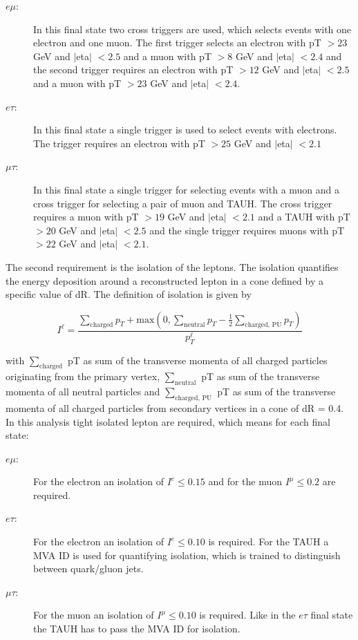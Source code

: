 \begin{description}
	\item [$e\mu$:] In this final state two cross triggers are used, which selects events with one electron and one muon. The first trigger selects an electron with \gls{pT} $> 23$ GeV and $|$\gls{eta}$|$ $< 2.5$ and a muon with \gls{pT} $> 8$ GeV and $|$\gls{eta}$|$ $< 2.4$ and the second trigger requires an electron with \gls{pT} $> 12$ GeV and $|$\gls{eta}$|$ $< 2.5$ and a muon with \gls{pT} $> 23$ GeV and $|$\gls{eta}$|$ $< 2.4$. 
	\item [$e\tau$:] In this final state a single trigger is used to select events with electrons. The trigger requires an electron with \gls{pT} $> 25$ GeV and $|$\gls{eta}$|$ $< 2.1$
	\item [$\mu\tau$:] In this final state a single trigger for selecting events with a muon and a cross trigger for selecting a pair of muon and \gls{TAUH}. The cross trigger requires a muon with \gls{pT} $> 19$ GeV and $|$\gls{eta}$|$ $< 2.1$ and a \gls{TAUH} with \gls{pT} $> 20$ GeV and $|$\gls{eta}$|$ $< 2.5$ and the single trigger requires muons with \gls{pT} $> 22$ GeV and $|$\gls{eta}$|$ $< 2.1$.
\end{description}

The second requirement is the isolation of the leptons. The isolation quantifies the energy deposition around a reconstructed lepton in a cone defined by a specific value of \gls{dR}. The definition of isolation is given by

\begin{equation}
	\label{eq:eq_3_1}
	I^{\ell} = \frac{\sum_{\text{charged}} p_{T} + \text{max}(0, \sum_{\text{neutral}} p_{T} - \frac{1}{2}\sum_{\text{charged, PU}} p_{T})}{p_T^{\ell}}  
\end{equation} 

with $\sum_{\text{charged}}$ \gls{pT} as sum of the transverse momenta of all charged particles originating from the primary vertex, $\sum_{\text{neutral}}$ \gls{pT} as sum of the transverse momenta of all neutral particles and $\sum_{\text{charged, PU}}$ \gls{pT} as sum of the transverse momenta of all charged particles from secondary vertices in a cone of \gls{dR} = 0.4. In this analysis tight isolated lepton are required, which means for each final state: 

\begin{description}
	\item [$e\mu$:] For the electron an isolation of $I^{e} \leq  0.15$ and for the muon $I^{\mu} \leq  0.2$ are required. 
	\item [$e\tau$:]  For the electron an isolation of $I^{e} \leq  0.10$ is required. For the \gls{TAUH} a \gls{MVA} ID is used for quantifying isolation, which is trained to distinguish between quark/gluon jets. 
	\item [$\mu\tau$:]  For the muon an isolation of $I^{\mu} \leq 0.10$ is required. Like in the $e\tau$ final state the \gls{TAUH} has to pass the \gls{MVA} ID for isolation.
\end{description}


